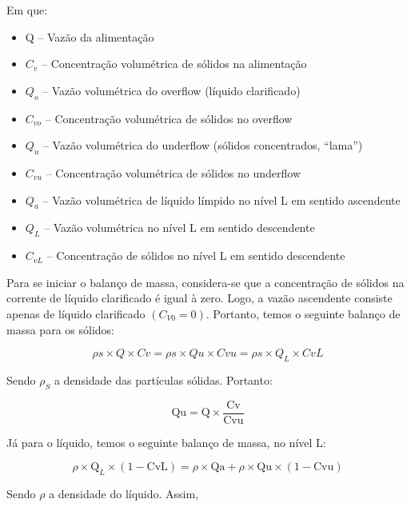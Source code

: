 Em que:

\begin{itemize}
\item Q – Vazão da alimentação
\item $ C_{v} $ – Concentração volumétrica de sólidos na alimentação
\item $ Q_{o} $ – Vazão volumétrica do overflow (líquido clarificado)
\item $ C_{vo} $ – Concentração volumétrica de sólidos no overflow
\item $ Q_{u} $ – Vazão volumétrica do underflow (sólidos concentrados, “lama”)
\item $ C_{vu }$ – Concentração volumétrica de sólidos no underflow
\item $ Q_{a} $ – Vazão volumétrica de líquido límpido no nível L em sentido ascendente
\item $ Q_{L} $ – Vazão volumétrica no nível L em sentido descendente
\item $ C_{vL} $ – Concentração de sólidos no nível L em sentido descendente
\end{itemize}



Para se iniciar o balanço de massa, considera-se que a concentração de sólidos na corrente de líquido clarificado é igual à zero. Logo, a vazão ascendente consiste apenas de líquido clarificado $ (C_{V0} = 0) $. Portanto, temos o seguinte balanço de massa para os sólidos:

\begin{equation}\label{key}
\rho s \times Q \times C v=\rho s \times Q u \times C v u=\rho s \times Q_{L} \times C v L
\end{equation}


Sendo $\rho_{S}$ a densidade das partículas sólidas. Portanto:

\begin{equation}\label{key}
\mathrm{Qu}=\mathrm{Q} \times \frac{\mathrm{Cv}}{\mathrm{Cvu}}
\end{equation}

Já para o líquido, temos o seguinte balanço de massa, no nível L:

\begin{equation}\label{key}
\rho \times \mathrm{Q}_{L} \times(1-\mathrm{CvL})=\rho \times \mathrm{Qa}+\rho \times \mathrm{Qu} \times(1-\mathrm{Cvu})
\end{equation}

Sendo $\rho$ a densidade do líquido. 
Assim,

